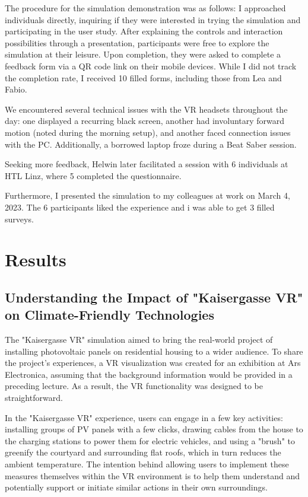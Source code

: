 \documentclass[draft, final]{vutinfth} %
\begin{document}
The procedure for the simulation demonstration was as follows: I approached individuals directly, inquiring if they were interested in trying the simulation and participating in the user study. After explaining the controls and interaction possibilities through a presentation, participants were free to explore the simulation at their leisure. Upon completion, they were asked to complete a feedback form via a QR code link on their mobile devices. While I did not track the completion rate, I received 10 filled forms, including those from Lea and Fabio.

We encountered several technical issues with the VR headsets throughout the day: one displayed a recurring black screen, another had involuntary forward motion (noted during the morning setup), and another faced connection issues with the PC. Additionally, a borrowed laptop froze during a Beat Saber session.

Seeking more feedback, Helwin later facilitated a session with 6 individuals at HTL Linz, where 5 completed the questionnaire.

Furthermore, I presented the simulation to my colleagues at work on March 4, 2023. The 6 participants liked the experience and i was able to get 3 filled surveys.

\chapter{Results}
\section{Understanding the Impact of "Kaisergasse VR" on Climate-Friendly Technologies}
The "Kaisergasse VR" simulation aimed to bring the real-world project of installing photovoltaic panels on residential housing to a wider audience. To share the project's experiences, a VR visualization was created for an exhibition at Ars Electronica, assuming that the background information would be provided in a preceding lecture. As a result, the VR functionality was designed to be straightforward.

In the "Kaisergasse VR" experience, users can engage in a few key activities: installing groups of PV panels with a few clicks, drawing cables from the house to the charging stations to power them for electric vehicles, and using a "brush" to greenify the courtyard and surrounding flat roofs, which in turn reduces the ambient temperature. The intention behind allowing users to implement these measures themselves within the VR environment is to help them understand and potentially support or initiate similar actions in their own surroundings.
\end{document}
